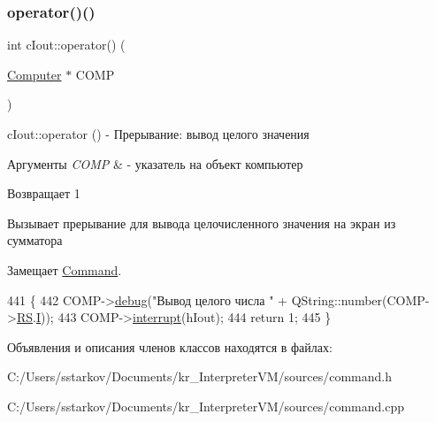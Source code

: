\subsubsection{\texorpdfstring{operator()()}{operator()()}}
{\footnotesize\ttfamily int c\+Iout\+::operator() (\begin{DoxyParamCaption}\item[{\hyperlink{class_computer}{Computer} $\ast$}]{C\+O\+MP }\end{DoxyParamCaption})\hspace{0.3cm}{\ttfamily [virtual]}}



c\+Iout\+::operator () -\/ Прерывание\+: вывод целого значения 


\begin{DoxyParams}{Аргументы}
{\em C\+O\+MP} & -\/ указатель на объект компьютер \\
\hline
\end{DoxyParams}
\begin{DoxyReturn}{Возвращает}
1
\end{DoxyReturn}
Вызывает прерывание для вывода целочисленного значения на экран из сумматора 

Замещает \hyperlink{class_command_a79939b66f3de892e91d7710844294716}{Command}.


\begin{DoxyCode}
441 \{
442     COMP->\hyperlink{class_computer_a10ca6c6b200630119201de16d7368e0f}{debug}(\textcolor{stringliteral}{"Вывод целого числа "} + QString::number(COMP->\hyperlink{class_computer_a874503110664b3cf821118d2ce9c2b96}{RS}.\hyperlink{union_computer_1_1data_a6e51de6e0351adc4e50b336a092bc4bb}{I}));
443     COMP->\hyperlink{class_computer_aa57b0ed2f3a9b168c2924174ec524bd4}{interrupt}(hIout);
444     \textcolor{keywordflow}{return} 1;
445 \}
\end{DoxyCode}


Объявления и описания членов классов находятся в файлах\+:\begin{DoxyCompactItemize}
\item 
C\+:/\+Users/sstarkov/\+Documents/kr\+\_\+\+Interpreter\+V\+M/sources/command.\+h\item 
C\+:/\+Users/sstarkov/\+Documents/kr\+\_\+\+Interpreter\+V\+M/sources/command.\+cpp\end{DoxyCompactItemize}
